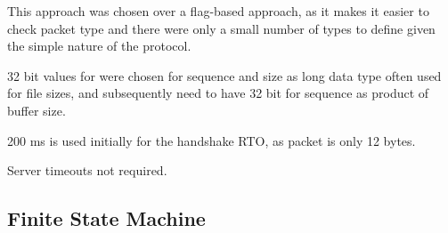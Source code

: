 \documentclass[12pt]{article}
\begin{document}
This approach was chosen over a flag-based approach, as it makes it easier to check packet type and there were only a small number of types to define given the simple nature of the protocol.

32 bit values for were chosen for sequence and size as long data type often used for file sizes, and subsequently need to have 32 bit for sequence as product of buffer size. 

200 ms is used initially for the handshake RTO, as packet is only 12 bytes.

Server timeouts not required.

\subsection{Finite State Machine}




\end{document}
